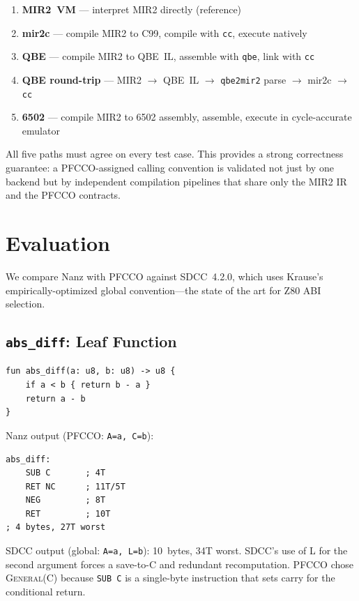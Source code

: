 \documentclass[sigplan,screen,nonacm]{acmart}
\begin{document}
\begin{enumerate}
\item \textbf{MIR2~VM} --- interpret MIR2 directly (reference)
\item \textbf{mir2c} --- compile MIR2 to C99, compile with \texttt{cc},
  execute natively
\item \textbf{QBE} --- compile MIR2 to QBE~IL, assemble with \texttt{qbe},
  link with \texttt{cc}
\item \textbf{QBE round-trip} --- MIR2 $\to$ QBE~IL $\to$ \texttt{qbe2mir2}
  parse $\to$ mir2c $\to$ \texttt{cc}
\item \textbf{6502} --- compile MIR2 to 6502 assembly, assemble, execute in
  cycle-accurate emulator
\end{enumerate}

All five paths must agree on every test case.  This provides a strong
correctness guarantee: a PFCCO-assigned calling convention is validated not
just by one backend but by independent compilation pipelines that share
only the MIR2 IR and the PFCCO contracts.

\section{Evaluation}
\label{sec:eval}

We compare Nanz with PFCCO against SDCC~4.2.0, which uses
Krause's~\cite{krause2022} empirically-optimized global convention---the
state of the art for Z80 ABI selection.

\subsection{\texttt{abs\_diff}: Leaf Function}

\begin{lstlisting}[language=nanz,caption={\texttt{abs\_diff} in Nanz.}]
fun abs_diff(a: u8, b: u8) -> u8 {
    if a < b { return b - a }
    return a - b
}
\end{lstlisting}

\noindent Nanz output (PFCCO: \texttt{A=a, C=b}):
\begin{lstlisting}[language=z80asm]
abs_diff:
    SUB C       ; 4T
    RET NC      ; 11T/5T
    NEG         ; 8T
    RET         ; 10T
; 4 bytes, 27T worst
\end{lstlisting}

\noindent SDCC output (global: \texttt{A=a, L=b}): 10~bytes, 34T worst.
SDCC's use of L for the second argument forces a save-to-C and redundant
recomputation.  PFCCO chose \textsc{General}(C) because \texttt{SUB~C} is a
single-byte instruction that sets carry for the conditional return.
\end{document}
